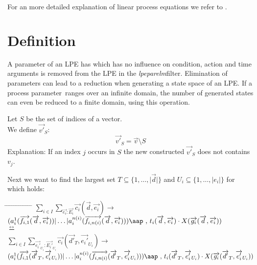 \documentclass[a4paper,10pt]{article}
\theoremstyle{plain}
\theoremstyle{definition}
\newcommand{\lpe}{linear process equation}
\newcommand{\tool}{\textit{lpeparelm}}
\newcommand{\ovr}{\overrightarrow}
\newcommand{\pp}{process parameter}
\newcommand{\bisim}{\frac{\leftrightarrow}{}}
\newcommand{\tab}{\hspace*{5.mm} \= \hspace*{5.mm} \= \hspace*{5.mm} \= \hspace*{5.mm} \= \hspace*{5.mm} \= \hspace*{5.mm}  \= \hspace*{5.mm}  \= \hspace*{5.mm}  \= \hspace*{5.mm} \= \hspace*{5.mm} \= \hspace*{5.mm}  \= \hspace*{5.mm}  \= \hspace*{5.mm}\kill}
\newcommand{\at}[1]{\mbox{\aap ,} #1}
\begin{document}
For an more detailed explanation of \lpe s  we refer to \cite{LPE_info}.

\section{Definition}
A parameter of an LPE has which has no influence on condition, action and time arguments is removed from the LPE in the \tool filter. Elimination of parameters can lead to a reduction when generating a state space of an LPE. If a \pp\ ranges over an infinite domain, the number of generated states can even be reduced to a finite domain, using this operation. %


\begin{defn} Let $S$ be the set of indices of a vector.\\ 
We define $\ovr{v'}_S$:\\
$$\ovr{v'}_S = \ovr{v} \setminus S$$
Explanation: If an index $j$ occurs in $S$ the new constructed $\ovr{v'}_S$ does not contains $v_j$.
\end{defn}

Next we want to find the largest set $T \subseteq \lbrace 1, \ldots , \vert \ovr{d} \vert \rbrace$  and $U_i \subseteq \lbrace 1, \ldots, \vert {e_i} \vert \rbrace$ for which holds:

\begin{tabbing}
\tab
\> $\sum_{i \in I} \sum_{\ovr{e_i}:\ovr{E_i}} \ovr{c_i} ( \ovr{d}, \ovr{e_i} ) \rightarrow $\\
\> \> \> $(a_i^1 (\ovr{f_{i,1}}(\ovr{d},\ovr{e_i})) \vert \ldots \vert a_i^{n(i)}(\ovr{f_{i,n(i)}}(\ovr{d},\ovr{e_i}))) \at \text{ } t_i(\ovr{d},\ovr{e_i})  \cdot X(\ovr{g_i}(\ovr{d},\ovr{e_i})) 
$ \\
$\bisim$ \\
\> $\sum_{i \in I} \sum_{\ovr{e_i'}_{U_i}:\ovr{E_i'}_{U_i}} \ovr{c_i} ( \ovr{d'}_T, \ovr{e_i'}_{U_i} ) \rightarrow $\\
\> \> \> 
$(a_i^1 (\ovr{f_{i,1}}(\ovr{d'}_T,\ovr{e_i'}_{U_i})) \vert \ldots \vert a_i^{n(i)}(\ovr{f_{i,n(i)}}(\ovr{d'}_T,\ovr{e_i'}_{U_i}))) \at \text{ } t_i(\ovr{d'}_T,\ovr{e_i'}_{U_i})  \cdot X(\ovr{g_i}(\ovr{d'}_T,\ovr{e_i'}_{U_i})) 
$ \\
\end{tabbing}
\end{document}

